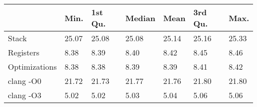 \begin{table}[ht]
\centering
\begin{tabular}{p{}p{}p{}p{}p{}p{}p{}}
  \hline
 & Min. & 1st Qu. & Median & Mean & 3rd Qu. & Max. \\ 
  \hline
Stack & 25.07 & 25.08 & 25.08 & 25.14 & 25.16 & 25.33 \\ 
  Registers & 8.38 & 8.39 & 8.40 & 8.42 & 8.45 & 8.46 \\ 
  Optimizations & 8.38 & 8.38 & 8.39 & 8.39 & 8.41 & 8.42 \\ 
  clang -O0 & 21.72 & 21.73 & 21.77 & 21.76 & 21.80 & 21.80 \\ 
  clang -O3 & 5.02 & 5.02 & 5.03 & 5.04 & 5.06 & 5.06 \\ 
   \hline
\end{tabular}
\end{table}
